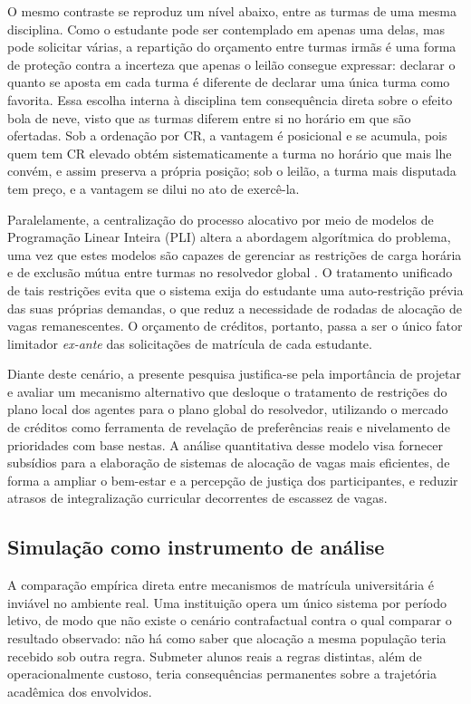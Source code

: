 \documentclass[
    12pt,
    openany,
    oneside,
    a4paper,
    english,
    brazil
]{abntex2}
\begin{document}
O mesmo contraste se reproduz um nível abaixo, entre as turmas de uma mesma disciplina. Como o estudante pode ser contemplado em apenas uma delas, mas pode solicitar várias, a repartição do orçamento entre turmas irmãs é uma forma de proteção contra a incerteza que apenas o leilão consegue expressar: declarar o quanto se aposta em cada turma é diferente de declarar uma única turma como favorita. Essa escolha interna à disciplina tem consequência direta sobre o efeito bola de neve, visto que as turmas diferem entre si no horário em que são ofertadas. Sob a ordenação por CR, a vantagem é posicional e se acumula, pois quem tem CR elevado obtém sistematicamente a turma no horário que mais lhe convém, e assim preserva a própria posição; sob o leilão, a turma mais disputada tem preço, e a vantagem se dilui no ato de exercê-la.

Paralelamente, a centralização do processo alocativo por meio de modelos de Programação Linear Inteira (PLI) altera a abordagem algorítmica do problema, uma vez que estes modelos são capazes de gerenciar as restrições de carga horária e de exclusão mútua entre turmas no resolvedor global \cite{wolsey1998}. O tratamento unificado de tais restrições evita que o sistema exija do estudante uma auto-restrição prévia das suas próprias demandas, o que reduz a necessidade de rodadas de alocação de vagas remanescentes. O orçamento de créditos, portanto, passa a ser o único fator limitador \textit{ex-ante} das solicitações de matrícula de cada estudante.

Diante deste cenário, a presente pesquisa justifica-se pela importância de projetar e avaliar um mecanismo alternativo que desloque o tratamento de restrições do plano local dos agentes para o plano global do resolvedor, utilizando o mercado de créditos como ferramenta de revelação de preferências reais e nivelamento de prioridades com base nestas. A análise quantitativa desse modelo visa fornecer subsídios para a elaboração de sistemas de alocação de vagas mais eficientes, de forma a ampliar o bem-estar e a percepção de justiça dos participantes, e reduzir atrasos de integralização curricular decorrentes de escassez de vagas.

\subsection{Simulação como instrumento de análise}

A comparação empírica direta entre mecanismos de matrícula universitária é inviável no ambiente real. Uma instituição opera um único sistema por período letivo, de modo que não existe o cenário contrafactual contra o qual comparar o resultado observado: não há como saber que alocação a mesma população teria recebido sob outra regra. Submeter alunos reais a regras distintas, além de operacionalmente custoso, teria consequências permanentes sobre a trajetória acadêmica dos envolvidos. 
\end{document}

